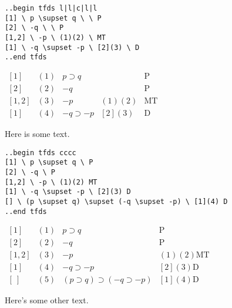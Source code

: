 \documentclass[12pt]{article}
\newcommand{\nl}{\\}
\numberwithin{equation}{section}
\begin{document}
\begin{flushleft}

\verb=..begin tfds l|l|c|l|l=\nl
\verb=[1] \ p \supset q \ \ P=\nl
\verb=[2] \ -q \ \ P=\nl
\verb=[1,2] \ -p \ (1)(2) \ MT=\nl
\verb=[1] \ -q \supset -p \ [2](3) \ D=\nl
\verb=..end tfds=\nl
\bigskip

$\begin{array}{l|l|c|l|l}
{[1]} & (1) & p \supset q & & \text{P} \\
{[2]} & (2) & -q & & \text{P} \\
{[1,2]} & (3) & -p & (1)(2) & \text{MT} \\
{[1]} & (4) & -q \supset -p & [2](3) & \text{D} 
\end{array}$

\bigskip

Here is some text.

\bigskip

\verb|..begin tfds cccc|\nl
\verb|[1] \ p \supset q \ P|\nl
\verb|[2] \ -q \ P|\nl
\verb|[1,2] \ -p \ (1)(2) MT|\nl
\verb|[1] \ -q \supset -p \ [2](3) D|\nl
\verb|[] \ (p \supset q) \supset (-q \supset -p) \ [1](4) D|\nl
\verb|..end tfds|\nl
\bigskip

$\begin{array}{cccc}
{[1]} & (1) & p \supset q & \text{P} \\
{[2]} & (2) & -q & \text{P} \\
{[1,2]} & (3) & -p & (1)(2) \text{MT} \\
{[1]} & (4) & -q \supset -p & [2](3) \text{D} \\
{[~]} & (5) & (p \supset q) \supset (-q \supset -p) & [1](4) \text{D} 
\end{array}$

\bigskip

Here's some other text.
\end{flushleft}
\end{document}
